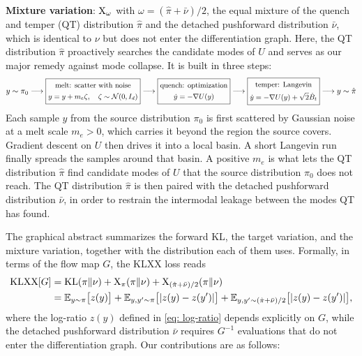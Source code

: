 \documentclass{article}
\begin{document}
\textbf{Mixture variation}: $\mathrm{X}_\omega$ with $\omega = (\hat\pi + \bar\nu)/2$, the equal mixture of the quench and temper (QT) distribution $\hat\pi$ and the detached pushforward distribution $\bar\nu$, {\color{blue}which is identical to $\nu$ but does not enter the differentiation graph}. Here, the QT distribution $\hat\pi$ {\color{blue}proactively searches the candidate modes of $U$} and serves as our {\color{blue}major remedy} against mode collapse. It is built in three steps:
	\begin{equation*}
		y\sim \pi_0 \longrightarrow \boxed{\small
		\begin{gathered}
			\text{melt: scatter with noise} \\
			y = y + m_e \zeta, \quad \zeta \sim \mathcal N(0,I_d)
		\end{gathered}
		} \longrightarrow \boxed{\small
		\begin{gathered}
			\text{quench: optimization} \\
			\dot y = -\nabla U(y)
		\end{gathered}
		} \longrightarrow \boxed{\small
		\begin{gathered}
			\text{temper: Langevin} \\
			\dot y = -\nabla U(y) + \sqrt{2}\dot B_t
		\end{gathered}
		} \longrightarrow y\sim \hat \pi
	\end{equation*}
Each sample $y$ from the source distribution $\pi_0$ is first scattered by Gaussian noise at a melt scale $m_e>0$, which carries it beyond the region the source covers. Gradient descent on $U$ then drives it into a local basin. A short Langevin run finally spreads the samples around that basin. A positive $m_e$ is what lets the QT distribution $\hat\pi$ find candidate modes of $U$ that the source distribution $\pi_0$ does not reach. The QT distribution $\hat\pi$ is then paired with the detached pushforward distribution $\bar\nu$, in order to restrain the intermodal leakage between the modes QT has found.

The graphical abstract summarizes the forward KL, the target variation, and the mixture variation, together with the distribution each of them uses. Formally, in terms of the flow map $G$, the KLXX loss reads
\begin{align}
	\mathrm{KLXX}[G] & = \mathrm{KL}(\pi\|\nu) + \mathrm{X}_\pi(\pi\|\nu) + \mathrm{X}_{(\hat\pi+\bar\nu)/2}(\pi\|\nu) \notag \\
	& = \mathbb E_{y\sim\pi}\big[z(y)\big] + \mathbb E_{y,y'\sim\pi}\big[|z(y)-z(y')|\big] + \mathbb E_{y,y'\sim(\hat\pi+\bar\nu)/2}\big[|z(y)-z(y')|\big],
	\label{eq: KLXX-G}
\end{align}
where the log-ratio $z(y)$ defined in \eqref{eq: log-ratio} depends explicitly on $G$, while the detached pushforward distribution $\bar\nu$ requires $G^{-1}$ evaluations that do not enter the differentiation graph. Our contributions are as follows:
\end{document}
